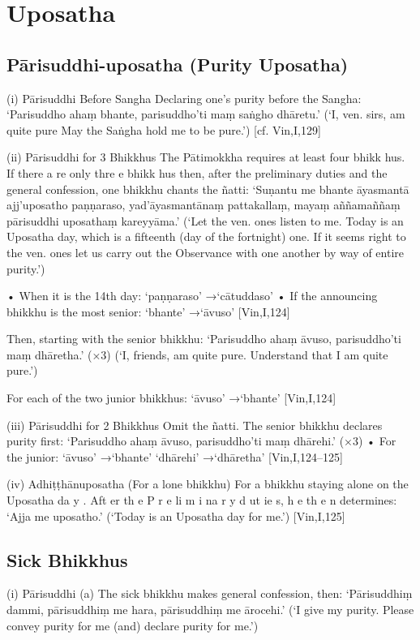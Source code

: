 \chapter{Uposatha}

\section{Pārisuddhi-uposatha (Purity Uposatha)}

(i) Pārisuddhi Before Sangha
Declaring one's purity before the Sangha:
‘Parisuddho ahaṃ bhante,
parisuddho'ti maṃ saṅgho dhāretu.’
(‘I, ven. sirs, am quite pure
May the Saṅgha hold me to be pure.’)
[cf. Vin,I,129]

(ii) Pārisuddhi for 3 Bhikkhus
The Pātimokkha requires at least four
bhikk hus. If there a re only thre e bhikk hus
then, after the preliminary duties and the general confession, one bhikkhu chants the ñatti:
‘Suṇantu me bhante āyasmantā ajj'uposatho
paṇṇaraso, yad'āyasmantānaṃ pattakallaṃ,
mayaṃ aññamaññaṃ pārisuddhi uposathaṃ
kareyyāma.’
(‘Let the ven. ones listen to me. Today is an Uposatha
day, which is a fifteenth (day of the fortnight) one. If
it seems right to the ven. ones let us carry out the
Observance with one another by way of entire purity.’)

• When it is the 14th day:
‘paṇṇaraso’ →‘cātuddaso’
• If the announcing bhikkhu is the most senior:
‘bhante’ →‘āvuso’
[Vin,I,124]

Then, starting with the senior bhikkhu:
‘Parisuddho ahaṃ āvuso,
parisuddho'ti maṃ dhāretha.’ (×3)
(‘I, friends, am quite pure.
Understand that I am quite pure.’)

For each of the two junior bhikkhus:
‘āvuso’ →‘bhante’
[Vin,I,124]

(iii) Pārisuddhi for 2 Bhikkhus
Omit the ñatti. The senior bhikkhu declares
purity first:
‘Parisuddho ahaṃ āvuso,
parisuddho'ti maṃ dhārehi.’ (×3)
• For the junior:
‘āvuso’ →‘bhante’
‘dhārehi’ →‘dhāretha’
[Vin,I,124–125]

(iv) Adhiṭṭhānuposatha (For a lone bhikkhu)
For a bhikkhu staying alone on the Uposatha
da y . Aft er th e P r e li m i na r y d ut ie s, h e th e n
determines:
‘Ajja me uposatho.’
(‘Today is an Uposatha day for me.’)
[Vin,I,125]

\section{Sick Bhikkhus}

(i) Pārisuddhi
(a) The sick bhikkhu makes general
confession, then:
‘Pārisuddhiṃ dammi,
pārisuddhiṃ me hara,
pārisuddhiṃ me ārocehi.’
(‘I give my purity. Please convey purity for me
(and) declare purity for me.’)

